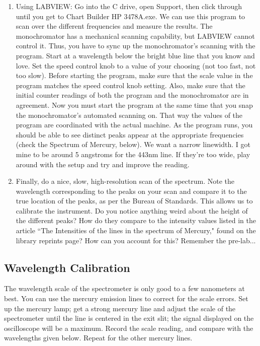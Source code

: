 \documentclass{../lab}
\begin{document}
\begin{enumerate}
    \item Using LABVIEW:
    Go into the C drive, open Support, then click through until you get to Chart Builder HP 3478A.exe. We can use this program to scan over the different frequencies and measure the results. The monochromator has a mechanical scanning capability, but LABVIEW cannot control it. Thus, you have to sync up the monochromator's scanning with the program. Start at a wavelength below the bright blue line that you know and love. Set the speed control knob to a value of your choosing (not too fast, not too slow). Before starting the program, make sure that the scale value in the program matches the speed control knob setting. Also, make sure that the initial counter readings of both the program and the monochromator are in agreement. Now you must start the program at the same time that you snap the monochromator's automated scanning on. That way the values of the program are coordinated with the actual machine. As the program runs, you should be able to see distinct peaks appear at the appropriate frequencies (check the Spectrum of Mercury, below). We want a narrow linewidth. I got mine to be around 5 angstroms for the 443nm line. If they're too wide, play around with the setup and try and improve the reading.
    
    \item Finally, do a nice, slow, high-resolution scan of the spectrum. Note the wavelength corresponding to the peaks on your scan and compare it to the true location of the peaks, as per the Bureau of Standards. This allows us to calibrate the instrument. Do you notice anything weird about the height of the different peaks? How do they compare to the intensity values listed in the article ``The Intensities of the lines in the spectrum of Mercury," found on the library reprints page? How can you account for this? Remember the pre-lab...
\end{enumerate}

\subsection{Wavelength Calibration}

The wavelength scale of the spectrometer is only good to a few nanometers at best. You can use the mercury emission lines to correct for the scale errors. Set up the mercury lamp; get a strong mercury line and adjust the scale of the spectrometer until the line is centered in the exit slit; the signal displayed on the oscilloscope will be a maximum. Record the scale reading, and compare with the wavelengths given below. Repeat for the other mercury lines.
\end{document}

